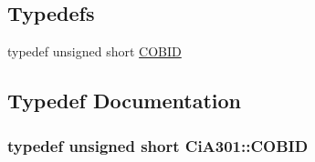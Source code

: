 \subsection*{Typedefs}
\begin{DoxyCompactItemize}
\item 
typedef unsigned short \hyperlink{namespace_ci_a301_aec5b5dbb2b60d2837c60499f6f297aa7}{C\+O\+B\+I\+D}
\end{DoxyCompactItemize}


\subsection{Typedef Documentation}
\hypertarget{namespace_ci_a301_aec5b5dbb2b60d2837c60499f6f297aa7}{}
\subsubsection[{C\+O\+B\+I\+D}]{\setlength{\rightskip}{0pt plus 5cm}typedef unsigned short {\bf Ci\+A301\+::\+C\+O\+B\+I\+D}}\label{namespace_ci_a301_aec5b5dbb2b60d2837c60499f6f297aa7}
